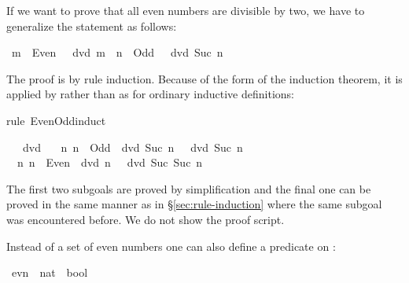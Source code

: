 \begin{isabellebody}
\begin{isamarkuptext}
If we want to prove that all even numbers are divisible by two, we have to
generalize the statement as follows:%
\end{isamarkuptext}%
\isamarkuptrue%
\isamarkupfalse%
\ {\isachardoublequoteopen}{\isacharparenleft}m\ {\isasymin}\ Even\ {\isasymlongrightarrow}\ {}\ dvd\ m{\isacharparenright}\ {\isasymand}\ {\isacharparenleft}n\ {\isasymin}\ Odd\ {\isasymlongrightarrow}\ {}\ dvd\ {\isacharparenleft}Suc\ n{\isacharparenright}{\isacharparenright}{\isachardoublequoteclose}%
\isadelimproof
%
\endisadelimproof
%
\isatagproof
%
\begin{isamarkuptxt}%
\noindent
The proof is by rule induction. Because of the form of the induction theorem,
it is applied by  rather than  as for ordinary
inductive definitions:%
\end{isamarkuptxt}%
\isamarkuptrue%
\isamarkupfalse%
{\isacharparenleft}rule\ Even{\isacharunderscore}Odd{\isachardot}induct{\isacharparenright}%
\begin{isamarkuptxt}%
\begin{isabelle}%
\ {}{\isachardot}\ {}\ dvd\ {}\isanewline
\ {}{\isachardot}\ {\isasymAnd}n{\isachardot}\ {\isasymlbrakk}n\ {\isasymin}\ Odd{\isacharsemicolon}\ {}\ dvd\ Suc\ n{\isasymrbrakk}\ {\isasymLongrightarrow}\ {}\ dvd\ Suc\ n\isanewline
\ {}{\isachardot}\ {\isasymAnd}n{\isachardot}\ {\isasymlbrakk}n\ {\isasymin}\ Even{\isacharsemicolon}\ {}\ dvd\ n{\isasymrbrakk}\ {\isasymLongrightarrow}\ {}\ dvd\ Suc\ {\isacharparenleft}Suc\ n{\isacharparenright}%
\end{isabelle}
The first two subgoals are proved by simplification and the final one can be
proved in the same manner as in \S\ref{sec:rule-induction}
where the same subgoal was encountered before.
We do not show the proof script.%
\end{isamarkuptxt}%
\isamarkuptrue%
%
\endisatagproof
{\isafoldproof}%
%
\isadelimproof
%
\endisadelimproof
%
\isamarkuptrue%
%
\begin{isamarkuptext}%
Instead of a set of even numbers one can also define a predicate on :%
\end{isamarkuptext}%
\isamarkuptrue%
\isamarkupfalse%
\ evn\ {\isacharcolon}{\isacharcolon}\ {\isachardoublequoteopen}nat\ {\isasymRightarrow}\ bool{\isachardoublequoteclose}\ \isanewline

\end{isabellebody}
